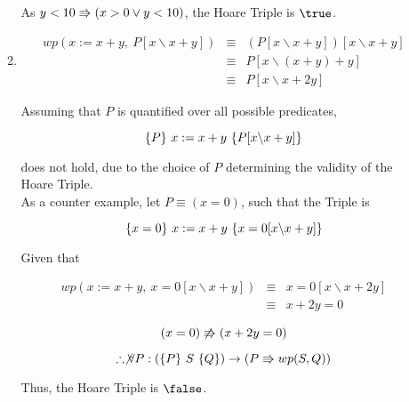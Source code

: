 \documentclass{article}
\begin{document}
\begin{enumerate}
\begin{enumerate}
        As $y < 10 \Rrightarrow (x > 0 \lor y < 10)$, the Hoare Triple is $\true$.

    \item
        \begin{eqnarray*}
            wp(x := x + y,\ P[x \backslash x + y]) & \equiv & (P[x \backslash x + y])[x \backslash x + y]\\
                & \equiv & P[x \backslash (x + y) + y]\\
                & \equiv & P[x \backslash x + 2y]
        \end{eqnarray*}

        Assuming that $P$ is quantified over all possible predicates,        

        \begin{equation}
        \{{P}\}\ {x := x + y}\ \{{P[x \backslash x + y]}\}
        \end{equation}
         
        does not hold, due to the choice of $P$ determining the validity of the Hoare Triple.\\

        As a counter example, let $P \equiv (x = 0)$, such that the Triple is

        \begin{equation}
        \{{x = 0}\}\ {x := x + y}\ \{{x = 0[x \backslash x + y]}\}
        \end{equation}

        Given that

        \begin{eqnarray*}
            wp(x := x + y,\ x = 0[x \backslash x + y]) & \equiv & x = 0[x \backslash x + 2y]\\
                & \equiv & x + 2y = 0
        \end{eqnarray*}

        \begin{equation}
        (x = 0) \not\Rrightarrow (x + 2y = 0)\\
        \end{equation}

        \begin{equation}
        \therefore \not\forall P : (\{{P}\}\ {S}\ \{{Q}\}) \rightarrow (P \Rrightarrow wp(S, Q))\\
        \end{equation}

        Thus, the Hoare Triple is $\false$.


\end{enumerate}
\end{enumerate}
\end{document}

